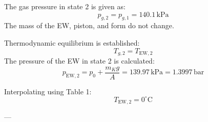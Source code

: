 The gas pressure in state 2 is given as:  
\[
p_{g,2} = p_{g,1} = 140.1 \, \text{kPa}
\]  
The mass of the EW, piston, and form do not change.  

Thermodynamic equilibrium is established:  
\[
T_{g,2} = T_{\text{EW},2}
\]  
The pressure of the EW in state 2 is calculated:  
\[
p_{\text{EW},2} = p_0 + \frac{m_K g}{A} = 139.97 \, \text{kPa} = 1.3997 \, \text{bar}
\]  

Interpolating using Table 1:  
\[
T_{\text{EW},2} = 0^\circ \text{C}
\]  

---
